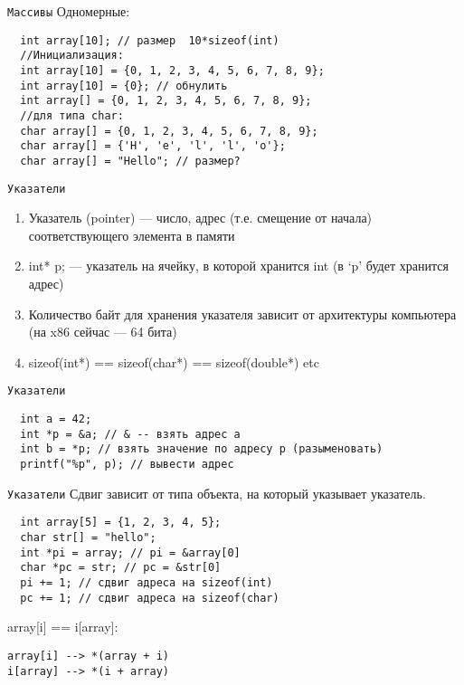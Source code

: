 \documentclass[pdf, 10pt, unicode]{beamer}
\begin{document}
\begin{frame}[fragile]{{\tt Массивы}}
Одномерные:
\begin{verbatim}
  int array[10]; // размер  10*sizeof(int)
  //Инициализация:
  int array[10] = {0, 1, 2, 3, 4, 5, 6, 7, 8, 9};
  int array[10] = {0}; // обнулить
  int array[] = {0, 1, 2, 3, 4, 5, 6, 7, 8, 9};
  //для типа char:
  char array[] = {0, 1, 2, 3, 4, 5, 6, 7, 8, 9};
  char array[] = {'H', 'e', 'l', 'l', 'o'};
  char array[] = "Hello"; // размер?
\end{verbatim}

\begin{enumerate}
\end{enumerate}

\end{frame}

\begin{frame}[fragile]{{\tt Указатели}}
\begin{enumerate}
  \item Указатель (pointer) --- число, адрес (т.е. смещение от начала) соответствующего элемента в памяти
  \item int* p; --- указатель на ячейку, в которой хранится int (в `p' будет хранится адрес)
  \item Количество байт для хранения указателя зависит от архитектуры компьютера (на x86 сейчас --- 64 бита)
    \item sizeof(int*) == sizeof(char*) == sizeof(double*) etc
\end{enumerate}
\end{frame}

\begin{frame}[fragile]{{\tt Указатели}}
\begin{verbatim}
  int a = 42;
  int *p = &a; // & -- взять адрес a
  int b = *p; // взять значение по адресу p (разыменовать)
  printf("%p", p); // вывести адрес
\end{verbatim}
\end{frame}

\begin{frame}[fragile]{{\tt Указатели}}
Сдвиг зависит от типа объекта, на который указывает указатель.
\begin{verbatim}
  int array[5] = {1, 2, 3, 4, 5};
  char str[] = "hello";
  int *pi = array; // pi = &array[0]
  char *pc = str; // pc = &str[0]
  pi += 1; // сдвиг адреса на sizeof(int)
  pc += 1; // сдвиг адреса на sizeof(char)
\end{verbatim}

array[i] == i[array]:
\begin{verbatim}
array[i] --> *(array + i)
i[array] --> *(i + array)
\end{verbatim}

\end{frame}
\end{document}
